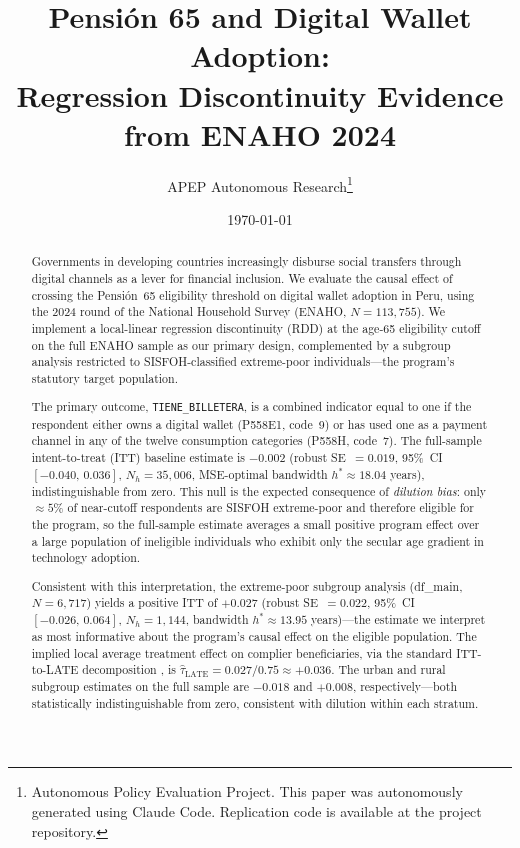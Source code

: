 \documentclass[12pt]{article}
\title{Pensi\'on 65 and Digital Wallet Adoption:\\
Regression Discontinuity Evidence from ENAHO 2024}
\author{APEP Autonomous Research\thanks{%
Autonomous Policy Evaluation Project. This paper was autonomously
generated using Claude Code. Replication code is available at the
project repository.}}
\date{\today}
\begin{document}
\maketitle

\begin{abstract}
\noindent
Governments in developing countries increasingly disburse social transfers
through digital channels as a lever for financial inclusion. We evaluate
the causal effect of crossing the Pensi\'on~65 eligibility threshold on
digital wallet adoption in Peru, using the 2024 round of the National
Household Survey (ENAHO, $N=113{,}755$). We implement a local-linear
regression discontinuity (RDD) at the age-65 eligibility cutoff on the
full ENAHO sample as our primary design, complemented by a subgroup
analysis restricted to SISFOH-classified extreme-poor individuals---the
program's statutory target population.

The primary outcome, \texttt{TIENE\_BILLETERA}, is a combined indicator
equal to one if the respondent either owns a digital wallet (P558E1,
code~9) or has used one as a payment channel in any of the twelve
consumption categories (P558H, code~7). The full-sample intent-to-treat
(ITT) baseline estimate is $-0.002$ (robust SE~$=0.019$,
95\%~CI $[-0.040,\,0.036]$, $N_h\!=\!35{,}006$, MSE-optimal
bandwidth $h^{*}\!\approx\!18.04$ years), indistinguishable from zero.
This null is the expected consequence of \emph{dilution bias}: only
$\approx\!5\%$ of near-cutoff respondents are SISFOH extreme-poor and
therefore eligible for the program, so the full-sample estimate averages
a small positive program effect over a large population of ineligible
individuals who exhibit only the secular age gradient in technology
adoption.

Consistent with this interpretation, the extreme-poor subgroup analysis
(df\_main, $N=6{,}717$) yields a positive ITT of $+0.027$ (robust
SE~$=0.022$, 95\%~CI $[-0.026,\,0.064]$, $N_h\!=\!1{,}144$, bandwidth
$h^{*}\!\approx\!13.95$ years)---the estimate we interpret as most
informative about the program's causal effect on the eligible population.
The implied local average treatment effect on complier beneficiaries, via
the standard ITT-to-LATE decomposition \citep{angrist2009}, is
$\hat{\tau}_{\text{LATE}} = 0.027 / 0.75 \approx +0.036$. The urban and
rural subgroup estimates on the full sample are $-0.018$ and $+0.008$,
respectively---both statistically indistinguishable from zero, consistent
with dilution within each stratum.


\end{abstract}
\end{document}
